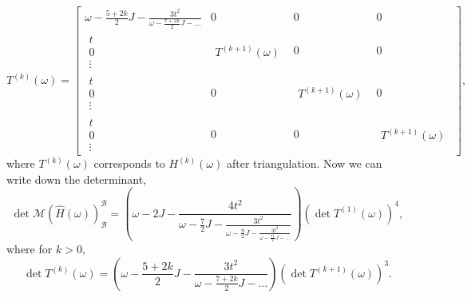 \documentclass{article}
\begin{document}
\begin{equation}
    T^{(k)}(\omega) =  
    \left[
    \begin{array}{c|c|c|c}
        \omega - \frac{5+2k}{2}J - \frac{3t^2}{
            \omega - \frac{7+2k}{2}J - \hdots
        } & 
            0 & 0 & 0 \\
        \hline
        \begin{array}{c} t \\ 0 \\ \vdots \end{array} & 
            \begin{array}{c} T^{(k+1)}(\omega) \end{array} & 0 & 0 \\
        \hline
        \begin{array}{c} t \\ 0 \\ \vdots \end{array} & 
            0 & \begin{array}{c} T^{(k+1)}(\omega) \end{array} & 0  \\
        \hline
        \begin{array}{c} t \\ 0 \\ \vdots \end{array} & 
            0 & 0 &\begin{array}{c} T^{(k+1)}(\omega) \end{array}
    \end{array}
    \right],
\end{equation}
where $T^{(k)}(\omega)$ corresponds to $H^{(k)}(\omega)$ after triangulation. 
Now we can write down the determinant,
\begin{equation}
    \det \mathcal{M}(\hat{H}(\omega))_\mathcal{B}^\mathcal{B} = 
    \left(\omega - 2J - \frac{4t^2}{
            \omega - \frac{7}{2}J - \frac{3t^2}{
                \omega - \frac{9}{2}J - \frac{3t^2}{
                    \omega - \frac{11}{2}J - \hdots
                }
            }
        }\right) 
        \left(\det T^{(1)}(\omega) \right)^4,
\end{equation}
where for $k > 0$,
\begin{equation}
    \det T^{(k)}(\omega) = 
        \left(\omega - \frac{5+2k}{2}J - \frac{3t^2}{
            \omega - \frac{7+2k}{2}J - \hdots
        }\right) 
        \left(\det T^{(k+1)}(\omega) \right)^3.
        \label{eq:det_triangular_recursive}
\end{equation}
\end{document}
